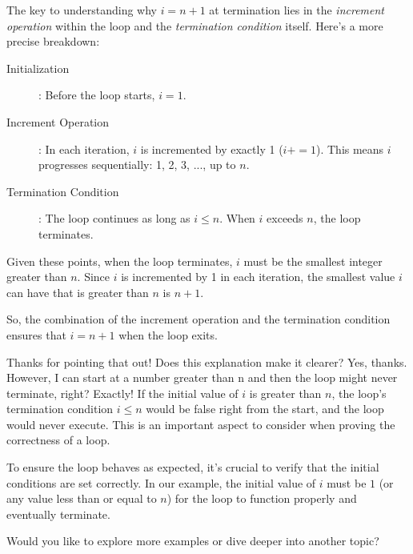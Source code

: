 \documentclass[twoside=false,DIV=14]{scrartcl}
\begin{document}
\begin{dialogue}
The key to understanding why \( i = n + 1 \) at termination lies in the \emph{increment operation} within the loop and the \emph{termination condition} itself. Here's a more precise breakdown:
\begin{description}
  \item[Initialization]: Before the loop starts, \( i = 1 \).
  \item[Increment Operation]: In each iteration, \( i \) is incremented by exactly 1 (\( i += 1 \)). This means \( i \) progresses sequentially: 1, 2, 3, ..., up to \( n \).
  \item[Termination Condition]: The loop continues as long as \( i \leq n \). When \( i \) exceeds \( n \), the loop terminates.
\end{description}
Given these points, when the loop terminates, \( i \) must be the smallest integer greater than \( n \). Since \( i \) is incremented by 1 in each iteration, the smallest value \( i \) can have that is greater than \( n \) is \( n + 1 \).

So, the combination of the increment operation and the termination condition ensures that \( i = n + 1 \) when the loop exits.

Thanks for pointing that out! Does this explanation make it clearer?
 Yes, thanks. However, I can start at a number greater than n and then the loop might never terminate, right?
 Exactly! If the initial value of \( i \) is greater than \( n \), the loop's termination condition \( i \leq n \) would be false right from the start, and the loop would never execute. This is an important aspect to consider when proving the correctness of a loop.

To ensure the loop behaves as expected, it's crucial to verify that the initial conditions are set correctly. In our example, the initial value of \( i \) must be \( 1 \) (or any value less than or equal to \( n \)) for the loop to function properly and eventually terminate.

Would you like to explore more examples or dive deeper into another topic?
\end{dialogue}
\end{document}
